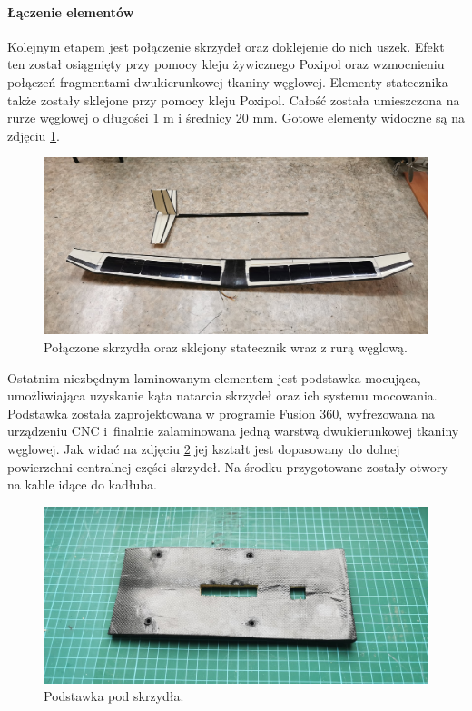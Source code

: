 \documentclass[12pt, a4paper]{article}
\begin{document}
\FloatBarrier
\paragraph{Łączenie elementów}\mbox{}

Kolejnym etapem jest połączenie skrzydeł oraz doklejenie do nich uszek. Efekt ten został osiągnięty przy pomocy kleju żywicznego Poxipol oraz wzmocnieniu połączeń fragmentami dwukierunkowej tkaniny węglowej. Elementy statecznika także zostały sklejone przy pomocy kleju Poxipol. Całość została umieszczona na rurze węglowej o długości 1 m i średnicy 20 mm. Gotowe elementy widoczne są na zdjęciu \ref{fig:sklejone}.

 \begin{figure}[ht]
    \centering
    \includegraphics[width=1\textwidth]{budowa13}
    \caption{Połączone skrzydła oraz sklejony statecznik wraz z rurą węglową.}
    \label{fig:sklejone}
\end{figure}

Ostatnim niezbędnym laminowanym elementem jest podstawka mocująca, umożliwiająca uzyskanie kąta natarcia skrzydeł oraz ich systemu mocowania. Podstawka została zaprojektowana w programie Fusion 360, wyfrezowana na urządzeniu CNC i~finalnie zalaminowana jedną warstwą dwukierunkowej tkaniny węglowej. Jak widać na zdjęciu \ref{fig:podstawka} jej kształt jest dopasowany do dolnej powierzchni centralnej części skrzydeł. Na środku przygotowane zostały otwory na kable idące do kadłuba.

 \begin{figure}[ht]
    \centering
    \includegraphics[width=1\textwidth]{podstawka}
    \caption{Podstawka pod skrzydła.}
    \label{fig:podstawka}
\end{figure}
\end{document}
